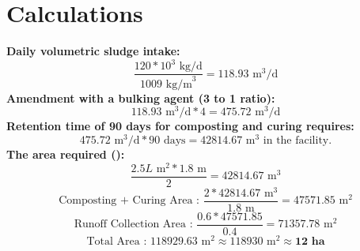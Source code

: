 \documentclass[a4paper]{article}
\begin{document}
\section*{Calculations}
\textbf{Daily volumetric sludge intake:}
$$\frac{120*10^3 \text{ kg/d}}{1009 \text{ kg/m}^3} = 118.93 \text{ m}^3\text{/d}$$
\textbf{Amendment with a bulking agent (3 to 1 ratio):}
$$118.93 \text{ m}^3\text{/d} * 4 = 475. 72 \text{ m}^3\text{/d}$$
\textbf{Retention time of 90 days for composting and curing requires:}
$$475. 72 \text{ m}^3\text{/d} * 90 \text{ days} = 42814.67 \text{ m}^3 \text{ in the facility.}$$
\textbf{The area required ():}
$$\frac{2.5L\text{ m}^2*1.8\text{ m}}{2}=42814.67 \text{ m}^3 $$
$$\text{Composting + Curing Area : } \frac{2*42814.67\text{ m}^3}{1.8\text{ m}}=47571.85 \text{ m}^2$$
$$\text{Runoff Collection Area : } \frac{0.6*47571.85}{0.4}=71357.78 \text{ m}^2$$
$$\text{Total Area : } 118929.63 \text{ m}^2 \approx 118930 \text{ m}^2 \approx \textbf{12 ha}$$
\end{document}
